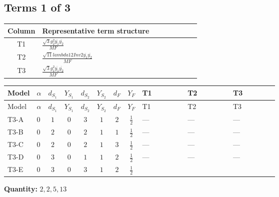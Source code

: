 \documentclass[8pt]{article}
\begin{document}
\begin{landscape}
\subsection*{Terms 1 of 3}
\begin{center}
\begin{tabular}{@{}c >{\raggedright\arraybackslash}p{0.82\linewidth}@{}}
\toprule
Column & Representative term structure \\
\midrule
T1 & \(\displaystyle \frac{\sqrt{3} g_{2}^{2} \overline{y_{1}} \overline{y_{2}}}{MF}\) \\
\midrule
T2 & \(\displaystyle \frac{\sqrt{11} lambda12Inv2 \overline{y_{1}} \overline{y_{2}}}{MF}\) \\
\midrule
T3 & \(\displaystyle \frac{\sqrt{3} g_{1}^{2} \overline{y_{1}} \overline{y_{2}}}{MF}\) \\
\midrule
\bottomrule
\end{tabular}
\end{center}
\smallskip
\tiny
\begin{longtable}{@{}llcccccc >{\raggedright\arraybackslash}p{0.21\linewidth} >{\raggedright\arraybackslash}p{0.21\linewidth} >{\raggedright\arraybackslash}p{0.21\linewidth}@{}}
\toprule
Model & $\alpha$ & $d_{S_1}$ & $Y_{S_1}$ & $d_{S_2}$ & $Y_{S_2}$ & $d_F$ & $Y_F$ & T1 & T2 & T3 \\
\midrule
\endfirsthead
\toprule
Model & $\alpha$ & $d_{S_1}$ & $Y_{S_1}$ & $d_{S_2}$ & $Y_{S_2}$ & $d_F$ & $Y_F$ & T1 & T2 & T3 \\
\midrule
\endhead
T3-A & $0$ & $1$ & $0$ & $3$ & $1$ & $2$ & $\frac{1}{2}$ & --- & --- & --- \\
\midrule
T3-B & $0$ & $2$ & $0$ & $2$ & $1$ & $1$ & $\frac{1}{2}$ & --- & --- & --- \\
\midrule
T3-C & $0$ & $2$ & $0$ & $2$ & $1$ & $3$ & $\frac{1}{2}$ & --- & --- & --- \\
\midrule
T3-D & $0$ & $3$ & $0$ & $1$ & $1$ & $2$ & $\frac{1}{2}$ & --- & --- & --- \\
\midrule
T3-E & $0$ & $3$ & $0$ & $3$ & $1$ & $2$ & $\frac{1}{2}$ & \scriptsize\adjustbox{max width=\linewidth}{$\begin{gathered} - \frac{49 \sqrt{3} g_{2}^{2} \overline{y_{1}} \overline{y_{2}}}{24 MF}\end{gathered}$} & \scriptsize\adjustbox{max width=\linewidth}{$\begin{gathered} - \frac{3 \sqrt{11} lambda12Inv2 \overline{y_{1}} \overline{y_{2}}}{22 MF}\end{gathered}$} & \scriptsize\adjustbox{max width=\linewidth}{$\begin{gathered} - \frac{\sqrt{3} g_{1}^{2} \overline{y_{1}} \overline{y_{2}}}{8 MF}\end{gathered}$} \\
\midrule
\bottomrule
\end{longtable}
\clearpage
\noindent\textbf{Quantity: }$\mathrm{2,2,5,13}$\par\smallskip

\end{landscape}
\end{document}
